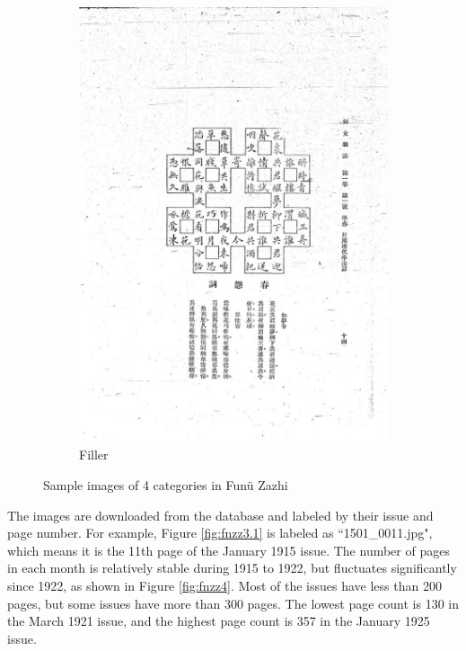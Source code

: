 \documentclass[12pt,twoside]{report}
\begin{document}
\begin{figure}[htbp]
\begin{subfigure}[b]{0.23\linewidth}
        \includegraphics[width=\linewidth]{./figures/fnzz3.4}
        \caption{Filler}
        \label{fig:fnzz3.4}
    \end{subfigure}
    \caption{Sample images of 4 categories in Funü Zazhi}
    \label{fig:fnzz3}
\end{figure}

The images are downloaded from the database \cite{fnzzpages} and labeled by their issue and page number. For example, Figure \ref{fig:fnzz3.1} is labeled as ``1501\_0011.jpg", which means it is the 11th page of the January 1915 issue. The number of pages in each month is relatively stable during 1915 to 1922, but fluctuates significantly since 1922, as shown in Figure \ref{fig:fnzz4}. Most of the issues have less than 200 pages, but some issues have more than 300 pages. The lowest page count is 130 in the March 1921 issue, and the highest page count is 357 in the January 1925 issue.
\end{document}

